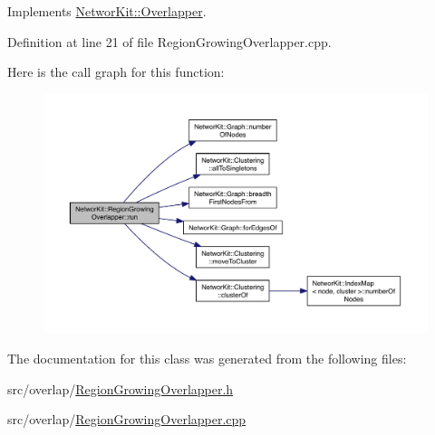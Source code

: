 Implements \hyperlink{class_networ_kit_1_1_overlapper_a92f5347bb5144e3d76b36cceac7a0409}{Networ\-Kit\-::\-Overlapper}.



Definition at line 21 of file Region\-Growing\-Overlapper.\-cpp.



Here is the call graph for this function\-:\nopagebreak
\begin{figure}[H]
\begin{center}
\leavevmode
\includegraphics[width=350pt]{class_networ_kit_1_1_region_growing_overlapper_aea22e56ac677a60f722e7037e5bf227c_cgraph}
\end{center}
\end{figure}




The documentation for this class was generated from the following files\-:\begin{DoxyCompactItemize}
\item 
src/overlap/\hyperlink{_region_growing_overlapper_8h}{Region\-Growing\-Overlapper.\-h}\item 
src/overlap/\hyperlink{_region_growing_overlapper_8cpp}{Region\-Growing\-Overlapper.\-cpp}\end{DoxyCompactItemize}
